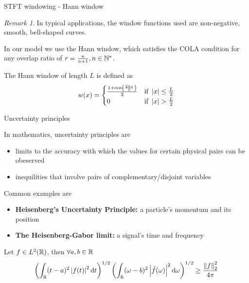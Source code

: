 \documentclass[10pt,american,ignorenonframetext,aspectratio=1610]{beamer}
\providecommand{\tightlist}{%
  \setlength{\itemsep}{0pt}\setlength{\parskip}{0pt}}
\theoremstyle{remark}
\newtheorem*{remark}{Remark}
\begin{document}
\begin{frame}{STFT windowing - Hann window}
\protect\hypertarget{stft-windowing---hann-window}{}

\begin{remark}
In typical applications, the window functions used are non-negative,
smooth, bell-shaped curves.
\end{remark}

In our model we use the Hann window, which satisfies the COLA condition
for any overlap ratio of \(r=\frac{n}{n+1},n\in\mathbb{N}^*\).

The Hann window of length \(L\) is defined as \[w(x)=\begin{cases}
\frac{1+\cos\left(\frac{2\pi x}{L}\right)}{2} & \text{if}~\left\lvert x\right\rvert\leq\frac{L}{2}\\
0 & \text{if}~\left\lvert x\right\rvert>\frac{L}{2}
\end{cases}\]

\end{frame}

\begin{frame}{Uncertainty principles}
\protect\hypertarget{uncertainty-principles}{}

In mathematics, uncertainty principles are

\begin{itemize}
\tightlist
\item
  limits to the accuracy with which the values for certain physical
  pairs can be obeserved
\item
  inequilities that involve pairs of complementary/disjoint variables
\end{itemize}

Common examples are

\begin{itemize}
\tightlist
\item
  \textbf{Heisenberg's Uncertainty Principle:} a particle's momentum and
  its position
\item
  \textbf{The Heisenberg-Gabor limit:} a signal's time and frequency
\end{itemize}

\begin{theorem}
Let $f\in L^2(\mathbb{R})$, then $\forall a,b\in\mathbb{R}$
$$ \left(\int_{\mathbb{R}} (t-a)^2\left\lvert f(t)\right\rvert^2\mathrm{d}t\right)^{1/2}
   \left(\int_{\mathbb{R}} (\omega-b)^2\left\lvert\hat f(\omega)\right\rvert^2\mathrm{d}\omega\right)^{1/2}
   \geq \frac{\left\lVert f\right\rVert_2^2}{4\pi}$$
\end{theorem}

\end{frame}
\end{document}
